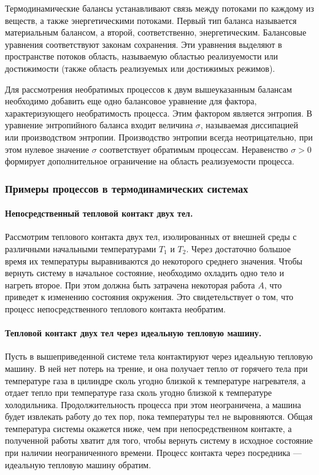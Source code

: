 \documentclass{article}
\begin{document}
	Термодинамические балансы устанавливают связь между потоками по каждому из веществ, а также энергетическими потоками. Первый тип баланса называется материальным балансом, а второй, соответственно, энергетическим. Балансовые уравнения соответствуют законам сохранения. Эти уравнения выделяют в пространстве потоков область, называемую областью реализуемости или достижимости (также область реализуемых или достижимых режимов).
	
	Для рассмотрения необратимых процессов к двум вышеуказанным балансам необходимо добавить еще одно балансовое уравнение для фактора, характеризующего необратимость процесса. Этим фактором является энтропия. В уравнение энтропийного баланса входит величина $\sigma$, называемая диссипацией или производством энтропии. Производство энтропии всегда неотрицательно, при этом нулевое значение $\sigma$ соответствует обратимым процессам. Неравенство $\sigma > 0$ формирует дополнительное ограничение на область реализуемости процесса.
	
	\subsubsection{Примеры процессов в термодинамических системах}
	
		\paragraph{Непосредственный тепловой контакт двух тел.}	Рассмотрим теплового контакта двух тел, изолированных от внешней среды с различными начальными температурами $T_1$ и $T_2$. Через достаточно большое время их температуры выравниваются до некоторого среднего значения. Чтобы вернуть систему в начальное состояние, необходимо охладить одно тело и нагреть второе. При этом должна быть затрачена некоторая работа $A$, что приведет к изменению состояния окружения. Это свидетельствует о том, что процесс непосредственного теплового контакта необратим.
		
		\paragraph{Тепловой контакт двух тел через идеальную тепловую машину.} Пусть в вышеприведенной системе тела контактируют через идеальную тепловую машину. В ней нет потерь на трение, и она получает тепло от горячего тела при температуре газа в цилиндре сколь угодно близкой к температуре нагревателя, а отдает тепло при температуре газа сколь угодно близкой к температуре холодильника. Продолжительность процесса при этом неограничена, а машина будет извлекать работу до тех пор, пока температуры тел не выровняются. Общая температура системы окажется ниже, чем при непосредственном контакте, а полученной работы хватит для того, чтобы вернуть систему в исходное состояние при наличии неограниченного времени. Процесс контакта через посредника --- идеальную тепловую машину обратим.
	
\end{document}
